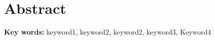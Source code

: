 
{
\chapter{Abstract}
\lipsum[1-2]

\noindent \textbf{Key words:} keyword1, keyword2, keyword2, keyword3, Keyword4
}

